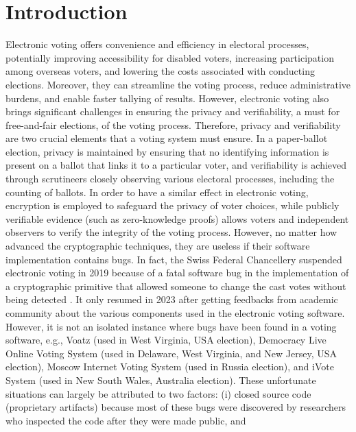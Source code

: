 \documentclass[sigconf,anonymous,review]{acmart}
\begin{document}
\section{Introduction}
Electronic voting offers convenience and efficiency in electoral processes, potentially improving 
accessibility for disabled voters, increasing participation among overseas voters, and lowering 
the costs associated with conducting elections. Moreover,
they can streamline the voting process, reduce administrative burdens, and enable 
faster tallying of results. However, electronic voting also brings significant 
challenges in ensuring the privacy and verifiability, a must for free-and-fair elections, of the voting process. Therefore, 
privacy and verifiability are two crucial elements that a voting system must ensure.
In a paper-ballot election, privacy is maintained by 
ensuring that no identifying information is present on a ballot that links it to a particular voter, 
and verifiability is achieved through scrutineers closely observing various electoral processes, 
including the counting of ballots. In order to have a similar effect in electronic voting, encryption 
is employed to safeguard the privacy of voter choices, while publicly verifiable evidence 
(such as zero-knowledge proofs) allows voters and independent observers to verify the integrity of 
the voting process. However, no matter how advanced the cryptographic techniques, they are useless 
if their software implementation contains bugs. In fact, 
the Swiss Federal Chancellery suspended electronic voting in 2019 because of 
a fatal software bug in the implementation of a cryptographic primitive 
that allowed someone to change the cast votes without being detected \cite{9152765}.
It only resumed in 2023 after getting feedbacks from academic 
community \cite{swiss_evoting_chronik} about the various components used in 
the electronic voting software. However, it is not an isolated  
instance where bugs have been found in a voting software, e.g., 
Voatz \cite{255334} (used in West Virginia, USA election),
Democracy Live Online Voting System \cite{263858} 
(used in Delaware, West Virginia, and New Jersey, USA election), 
Moscow Internet Voting System \cite{10.1007/978-3-030-51280-4_3}
(used in Russia election), and iVote System \cite{10.1007/978-3-319-22270-7_3, 10.1145/3014812.3014837} 
(used in New South Wales, Australia election). 
These unfortunate situations can largely be attributed to two factors: 
(i) closed source code (proprietary artifacts) because most of these bugs were 
discovered by researchers who inspected the code after they were made public, and 
\end{document}
